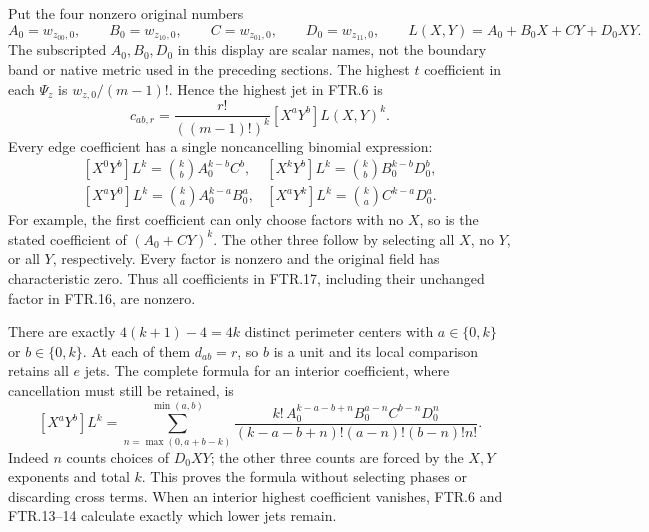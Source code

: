 Put the four nonzero original numbers
\[
 A_0=w_{z_{00},0},\qquad B_0=w_{z_{10},0},\qquad
 C=w_{z_{01},0},\qquad D_0=w_{z_{11},0},\qquad
 L(X,Y)=A_0+B_0X+CY+D_0XY.
 \tag{FTR.15}
\]
The subscripted $A_0,B_0,D_0$ in this display are scalar names, not
the boundary band or native metric used in the preceding sections.
The highest $t$ coefficient in each $\Psi_z$ is
$w_{z,0}/(m-1)!$. Hence the highest jet in FTR.6 is
\[
 c_{ab,r}=\frac{r!}{((m-1)!)^k}[X^aY^b]L(X,Y)^k.
 \tag{FTR.16}
\]
Every edge coefficient has a single noncancelling binomial expression:
\[
 \begin{array}{ll}
 [X^0Y^b]L^k=\binom{k}{b}A_0^{k-b}C^b,&
 [X^kY^b]L^k=\binom{k}{b}B_0^{k-b}D_0^b,\\[3pt]
 [X^aY^0]L^k=\binom{k}{a}A_0^{k-a}B_0^a,&
 [X^aY^k]L^k=\binom{k}{a}C^{k-a}D_0^a.
 \end{array}\tag{FTR.17}
\]
For example, the first coefficient can only choose factors with no
$X$, so is the stated coefficient of $(A_0+CY)^k$. The other three
follow by selecting all $X$, no $Y$, or all $Y$, respectively.
Every factor is nonzero and the original field has characteristic
zero. Thus all coefficients in FTR.17, including their unchanged
factor in FTR.16, are nonzero.

There are exactly $4(k+1)-4=4k$ distinct perimeter centers with
$a\in\{0,k\}$ or $b\in\{0,k\}$. At each of them $d_{ab}=r$,
so $b$ is a unit and its local comparison retains all $e$ jets.
The complete formula for an interior coefficient, where cancellation
must still be retained, is
\[
 [X^aY^b]L^k
  =\sum_{n=\max(0,a+b-k)}^{\min(a,b)}
    \frac{k!\,A_0^{k-a-b+n}B_0^{a-n}C^{b-n}D_0^n}
    {(k-a-b+n)!(a-n)!(b-n)!n!}.
 \tag{FTR.18}
\]
Indeed $n$ counts choices of $D_0XY$; the other three counts
are forced by the $X,Y$ exponents and total $k$. This proves the
formula without selecting phases or discarding cross terms. When
an interior highest coefficient vanishes, FTR.6 and FTR.13--14
calculate exactly which lower jets remain.

